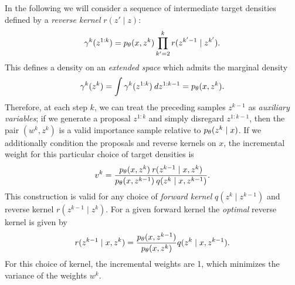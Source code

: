 \documentclass{article}
\theoremstyle{definition}
\begin{document}
In the following we will consider a sequence of intermediate target densities defined by a \emph{reverse kernel} $r(z' \mid z)$:
\begin{align*}
    \gamma^k(z^{1:k})
    =
    p_\theta(x,z^k) \prod_{k'=2}^{k} r(z^{k'-1} \mid z^{k'})
    .
\end{align*}
This defines a density on an \emph{extended space} which admits the marginal density
\begin{align*}
    \gamma^k(z^k) = \int \gamma^k(z^{1:k}) \: dz^{1:k-1} = p_\theta(x, z^k).
\end{align*}
Therefore, at each step $k$, we can treat the preceding samples $z^{k-1}$ as \emph{auxiliary variables}; if we generate a proposal $z^{1:k}$ and simply disregard $z^{1:k-1}$, then the pair $(w^k, z^k)$ is a valid importance sample relative to $p_\theta(z^k \mid x)$. 
If we additionally condition the proposals and reverse kernels on $x$, the incremental weight for this particular choice of target densities is
\begin{align}
    \label{eq:incremental-weight-forward-reverse}
    v^k 
    = 
    \frac{p_\theta(x,z^k) \: r(z^{k-1} \mid x, z^k)}
         {p_\theta(x,z^{k-1}) \: q(z^{k} \mid x, z^{k-1})}
    .
\end{align}
This construction is valid for any choice of \emph{forward kernel}  $q(z^k \mid z^{k-1})$ and reverse kernel $r(z^{k-1} \mid z^{k})$. For a given forward kernel the \emph{optimal} reverse kernel is given by
\begin{align*}
    r(z^{k-1} \mid x, z^k)
    =   
    \frac{p_\theta(x, z^{k-1})}
         {p_\theta(x, z^k)}
    q(z^{k} \mid x, z^{k-1})
    .
\end{align*}
For this choice of kernel, the incremental weights are 1, which minimizes the variance of the weights $w^k$.
\end{document}
